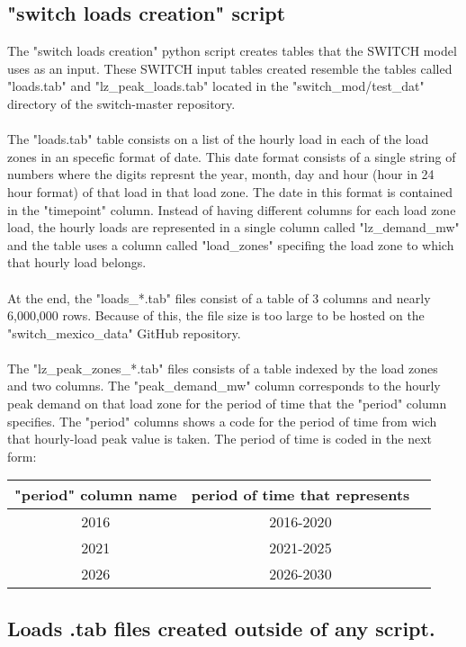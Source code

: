 \documentclass{article}
\begin{document}
\subsection{"switch loads creation" script}
The "switch loads creation" python script creates tables that the SWITCH model uses as an input. These SWITCH input tables created resemble the tables called "loads.tab" and "lz\_peak\_loads.tab" located in the "switch\_mod/test\_dat" directory of the switch-master repository.
\\
\\The "loads.tab" table consists on a list of the hourly load in each of the load zones in an specefic format of date. This date format consists of a single string of numbers where the digits represnt the year, month, day and hour (hour in 24 hour format) of that load in that load zone. The date in this  format is contained in the "timepoint" column. Instead of having different columns for each load zone load, the hourly loads are represented in a single column called "lz\_demand\_mw" and the table uses a column called "load\_zones" specifing the load zone to which that hourly load belongs.
\\
\\At the end, the "loads\_*.tab" files consist of a table of 3 columns and nearly 6,000,000 rows. Because of this, the file size is too large to be hosted on the "switch\_mexico\_data" GitHub repository.
\\
\\The "lz\_peak\_zones\_*.tab" files consists of a table indexed by the load zones and two columns. The "peak\_demand\_mw" column corresponds to the hourly peak demand on that load zone for the period of time that the "period" column specifies. The "period" columns shows a code for the period of time from wich that hourly-load peak value is taken. The period of time is coded in the next form:
\begin{table}[h!]
\centering
\begin{tabular}{ | c| c| c| }
\hline
"period" column name & period of time that represents \\
\hline
2016 & 2016-2020 \\ \hline
2021 & 2021-2025 \\ \hline
2026 & 2026-2030 \\ \hline
\end{tabular} 
\end{table}
\subsection{Loads .tab files created outside of any script.}
  
\end{document}
